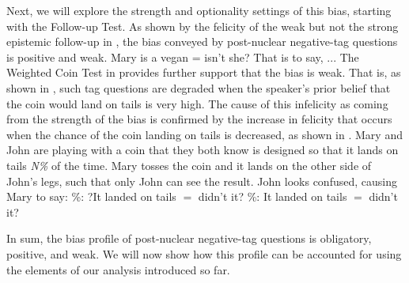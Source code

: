 \documentclass[output=paper,colorlinks,citecolor=brown]{langscibook}
\begin{document}
Next, we will explore the strength and optionality settings of this bias, starting with the Follow-up Test. As shown by the felicity of the weak but not the strong epistemic follow-up in , the bias conveyed by post-nuclear negative-tag questions is positive and weak.
\is{}
\ea Mary is a vegan = isn't she? That is to say, ...\label{Neg.PNu.TIS}
\z
\z
{}
The Weighted Coin Test in  provides further support that the bias is weak. That is, as shown in , such tag questions are degraded when the speaker's prior belief that the coin would land on tails is very high. The cause of this infelicity as coming from the strength of the bias is confirmed by the increase in felicity that occurs when the chance of the coin landing on tails is decreased, as shown in .
\is{}
\ea Mary and John are playing with a coin that they both know is designed so that it lands on tails \textit{N\%} of the time. Mary tosses the coin and it lands on the other side of John's legs, such that only John can see the result. John looks confused, causing Mary to say:\label{Neg.PNu.WC}
    \%: ?It landed on tails $=$ didn't it?\label{Neg.Pnu.WC.99}
    \%: It landed on tails $=$ didn't it?\label{Neg.Pnu.WC.70}
    \z
\z
{}

In sum, the bias profile of  post-nuclear negative-tag questions is obligatory, positive, and weak. We will now show how this profile can be accounted for using the elements of our analysis introduced so far. 
\end{document}
